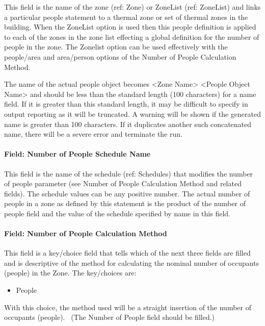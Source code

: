 This field is the name of the zone (ref: Zone) or ZoneList (ref: ZoneList) and links a particular people statement to a thermal zone or set of thermal zones in the building. When the ZoneList option is used then this people definition is applied to each of the zones in the zone list effecting a global definition for the number of people in the zone. The Zonelist option can be used effectively with the people/area and area/person options of the Number of People Calculation Method.

The name of the actual people object becomes \textless{}Zone Name\textgreater{} \textless{}People Object Name\textgreater{} and should be less than the standard length (100 characters) for a name field. If it is greater than this standard length, it may be difficult to specify in output reporting as it will be truncated. A warning will be shown if the generated name is greater than 100 characters. If it duplicates another such concatenated name, there will be a severe error and terminate the run.

\paragraph{Field: Number of People Schedule Name}\label{field-number-of-people-schedule-name}

This field is the name of the schedule (ref: Schedules) that modifies the number of people parameter (see Number of People Calculation Method and related fields). The schedule values can be any positive number. The actual number of people in a zone as defined by this statement is the product of the number of people field and the value of the schedule specified by name in this field.

\paragraph{Field: Number of People Calculation Method}\label{field-number-of-people-calculation-method}

This field is a key/choice field that tells which of the next three fields are filled and is descriptive of the method for calculating the nominal number of occupants (people) in the Zone. The key/choices are:

\begin{itemize}
\tightlist
\item
  People
\end{itemize}

With this choice, the method used will be a straight insertion of the number of occupants (people).~ (The Number of People field should be filled.)

